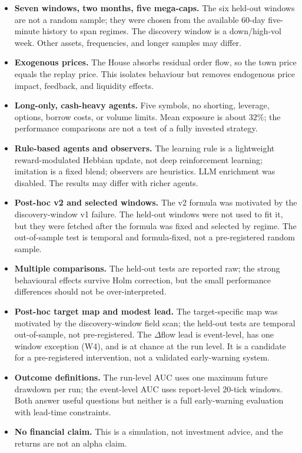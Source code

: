 \documentclass[11pt]{article}
\begin{document}
\begin{itemize}
  \item \textbf{Seven windows, two months, five mega-caps.} The six held-out
  windows are not a random sample; they were chosen from the available 60-day
  five-minute history to span regimes. The discovery window is a down/high-vol
  week. Other assets, frequencies, and longer samples may differ.
  \item \textbf{Exogenous prices.} The House absorbs residual order flow, so the
  town price equals the replay price. This isolates behaviour but removes
  endogenous price impact, feedback, and liquidity effects.
  \item \textbf{Long-only, cash-heavy agents.} Five symbols, no shorting,
  leverage, options, borrow costs, or volume limits. Mean exposure is about
  $32\%$; the performance comparisons are not a test of a fully invested
  strategy.
  \item \textbf{Rule-based agents and observers.} The learning rule is a
  lightweight reward-modulated Hebbian update, not deep reinforcement learning;
  imitation is a fixed blend; observers are heuristics. LLM enrichment was
  disabled. The results may differ with richer agents.
  \item \textbf{Post-hoc v2 and selected windows.} The v2 formula was motivated by
  the discovery-window v1 failure. The held-out windows were not used to fit it,
  but they were fetched after the formula was fixed and selected by regime. The
  out-of-sample test is temporal and formula-fixed, not a pre-registered random
  sample.
  \item \textbf{Multiple comparisons.} The held-out tests are reported raw; the
  strong behavioural effects survive Holm correction, but the small performance
  differences should not be over-interpreted.
  \item \textbf{Post-hoc target map and modest lead.} The target-specific map was
  motivated by the discovery-window field scan; the held-out tests are temporal
  out-of-sample, not pre-registered. The $\Delta$flow lead is event-level, has one
  window exception (W4), and is at chance at the run level. It is a candidate for
  a pre-registered intervention, not a validated early-warning system.
  \item \textbf{Outcome definitions.} The run-level AUC uses one maximum future
  drawdown per run; the event-level AUC uses report-level 20-tick windows. Both
  answer useful questions but neither is a full early-warning evaluation with
  lead-time constraints.
  \item \textbf{No financial claim.} This is a simulation, not investment advice,
  and the returns are not an alpha claim.
\end{itemize}
\end{document}
